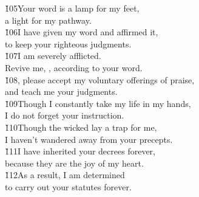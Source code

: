 \begin{poetry}
\poeml \v{105}Your word is a lamp for my feet, \\
\poemll    a light for my pathway. \\
\poeml \v{106}I have given my word and affirmed it, \\
\poemll    to keep your righteous judgments. \\
\poeml \v{107}I am severely afflicted. \\
\poemll    Revive me, , according to your word. \\
\poeml \v{108}, please accept my voluntary offerings of praise, \\
\poemll    and teach me your judgments. \\
\poeml \v{109}Though I constantly take my life in my hands, \\
\poemll    I do not forget your instruction. \\
\poeml \v{110}Though the wicked lay a trap for me, \\
\poemll    I haven't wandered away from your precepts. \\
\poeml \v{111}I have inherited your decrees forever, \\
\poemll    because they are the joy of my heart. \\
\poeml \v{112}As a result, I am determined \\
\poemll    to carry out your statutes forever.
\end{poetry}

